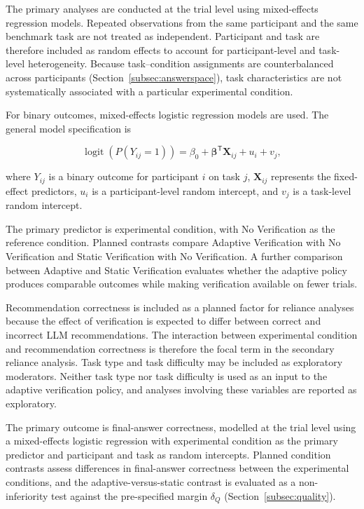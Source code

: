 \documentclass[oneside,final,14pt,a4paper]{extreport}
\begin{document}
The primary analyses are conducted at the trial level using mixed-effects
regression models. Repeated observations from the same participant and the
same benchmark task are not treated as independent. Participant and task are
therefore included as random effects to account for participant-level and
task-level heterogeneity. Because task--condition assignments are
counterbalanced across participants (Section~\ref{subsec:answerspace}), task
characteristics are not systematically associated with a particular
experimental condition.

For binary outcomes, mixed-effects logistic regression models are used. The
general model specification is

$$
\operatorname{logit}\!\left(P(Y_{ij}=1)\right)
=
\beta_0
+
\boldsymbol{\beta}^{\mathsf{T}}\mathbf{X}_{ij}
+
u_i
+
v_j,
$$

where $Y_{ij}$ is a binary outcome for participant $i$ on task $j$,
$\mathbf{X}_{ij}$ represents the fixed-effect predictors, $u_i$ is a
participant-level random intercept, and $v_j$ is a task-level random
intercept.

The primary predictor is experimental condition, with No Verification as the
reference condition. Planned contrasts compare Adaptive Verification with No
Verification and Static Verification with No Verification. A further
comparison between Adaptive and Static Verification evaluates whether the
adaptive policy produces comparable outcomes while making verification
available on fewer trials.

Recommendation correctness is included as a planned factor for reliance
analyses because the effect of verification is expected to differ between
correct and incorrect LLM recommendations. The interaction between
experimental condition and recommendation correctness is therefore the focal
term in the secondary reliance analysis. Task type and task difficulty may be
included as exploratory moderators. Neither task type nor task difficulty is
used as an input to the adaptive verification policy, and analyses involving
these variables are reported as exploratory.

The primary outcome is final-answer correctness, modelled at the trial level
using a mixed-effects logistic regression with experimental condition as the
primary predictor and participant and task as random intercepts. Planned
condition contrasts assess differences in final-answer correctness between
the experimental conditions, and the adaptive-versus-static contrast is
evaluated as a non-inferiority test against the pre-specified margin
$\delta_Q$ (Section~\ref{subsec:quality}).
\end{document}
